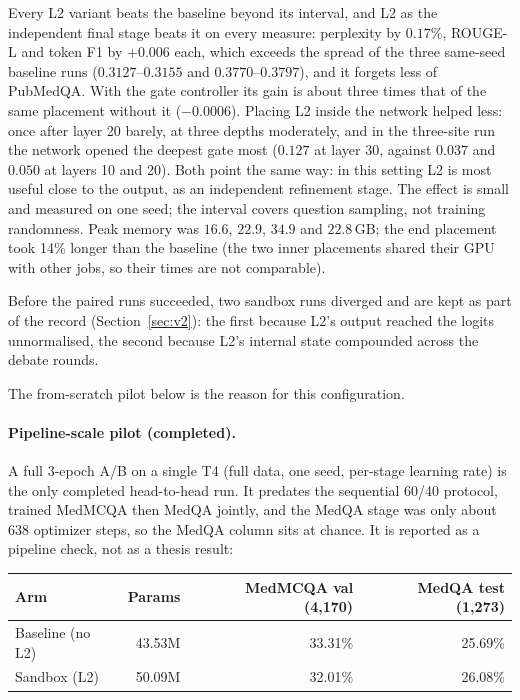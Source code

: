 \documentclass[11pt,a4paper]{article}
\theoremstyle{plain}
\theoremstyle{definition}
\theoremstyle{remark}
\begin{document}
\noindent
Every L2 variant beats the baseline beyond its interval, and L2 as the
independent final stage beats it on every measure: perplexity by $0.17\%$,
ROUGE-L and token F1 by $+0.006$ each, which exceeds the spread of the three
same-seed baseline runs ($0.3127$--$0.3155$ and $0.3770$--$0.3797$), and it
forgets less of PubMedQA. With the gate controller its gain is about three
times that of the same placement without it ($-0.0006$). Placing L2 inside the
network helped less: once after layer 20 barely, at three depths moderately,
and in the three-site run the network opened the deepest gate most ($0.127$
at layer 30, against $0.037$ and $0.050$ at layers 10 and 20). Both point the
same way: in this setting L2 is most useful close to the output, as an
independent refinement stage. The effect is small and measured on one seed;
the interval covers question sampling, not training randomness. Peak memory
was $16.6$, $22.9$, $34.9$ and $22.8$\,GB; the end placement took 14\% longer
than the baseline (the two inner placements shared their GPU with other jobs,
so their times are not comparable).

\noindent
Before the paired runs succeeded, two sandbox runs diverged and are kept as
part of the record (Section~\ref{sec:v2}): the first because L2's output
reached the logits unnormalised, the second because L2's internal state
compounded across the debate rounds.

\noindent
The from-scratch pilot below is the reason for this configuration.

\paragraph{Pipeline-scale pilot (completed).}
A full 3-epoch A/B on a single T4 (full data, one seed, per-stage learning
rate) is the only completed head-to-head run. It predates the sequential
60/40 protocol, trained MedMCQA then MedQA jointly, and the MedQA stage was
only about 638 optimizer steps, so the MedQA column sits at chance. It is
reported as a pipeline check, not as a thesis result:

\begin{center}
\small
\begin{tabular}{@{}lrrr@{}}
\toprule
\rowcolor{ekHeadBG}\color{white}\textbf{Arm} & \color{white}\textbf{Params} & \color{white}\textbf{MedMCQA val (4{,}170)} & \color{white}\textbf{MedQA test (1{,}273)} \\
\midrule
Baseline (no L2) & 43.53M & 33.31\% & 25.69\% \\
Sandbox (L2) & 50.09M & 32.01\% & 26.08\% \\
\bottomrule
\end{tabular}
\end{center}
\end{document}
